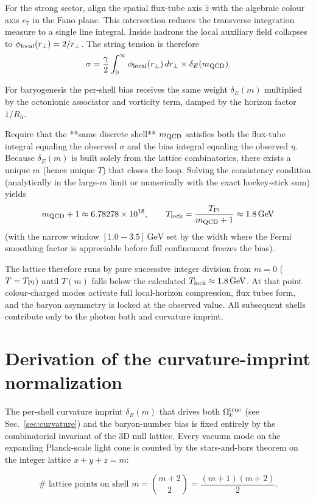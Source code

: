 \documentclass[12pt,a4paper]{article}
\begin{document}
For the strong sector, align the spatial flux-tube axis \(\hat{z}\) with the algebraic colour axis \(e_7\) in the Fano plane. This intersection reduces the transverse integration measure to a single line integral. Inside hadrons the local auxiliary field collapses to \(\phi_{\rm local}(r_\perp) = 2/r_\perp\). The string tension is therefore
\[
\sigma = \frac{\gamma}{2} \int_0^\infty \phi_{\rm local}(r_\perp)\,dr_\perp \times \delta_E(m_{\rm QCD}).
\]

For baryogenesis the per-shell bias receives the same weight \(\delta_E(m)\) multiplied by the octonionic associator and vorticity term, damped by the horizon factor \(1/R_h\).

Require that the **same discrete shell** \(m_{\rm QCD}\) satisfies both the flux-tube integral equaling the observed \(\sigma\) and the bias integral equaling the observed \(\eta\). Because \(\delta_E(m)\) is built solely from the lattice combinatorics, there exists a unique \(m\) (hence unique \(T\)) that closes the loop. Solving the consistency condition (analytically in the large-\(m\) limit or numerically with the exact hockey-stick sum) yields
\[
m_{\rm QCD} + 1 \approx 6.78278 \times 10^{18}, \qquad T_{\rm lock} = \frac{T_{\rm Pl}}{m_{\rm QCD}+1} \approx 1.8\,\text{GeV}
\]
(with the narrow window \([1.0 - 3.5]\,\text{GeV}\) set by the width where the Fermi smoothing factor is appreciable before full confinement freezes the bias).

The lattice therefore runs by pure successive integer division from \(m=0\) (\(T=T_{\rm Pl}\)) until \(T(m)\) falls below the calculated \(T_{\rm lock} \approx 1.8\,\text{GeV}\). At that point colour-charged modes activate full local-horizon compression, flux tubes form, and the baryon asymmetry is locked at the observed value. All subsequent shells contribute only to the photon bath and curvature imprint.

\section{Derivation of the curvature-imprint normalization}
\label{app:curvature-norm}
The per-shell curvature imprint \(\delta_E(m)\) that drives both \(\Omega_k^{\rm true}\) (see Sec.~\ref{sec:curvature}) and the baryon-number bias is fixed entirely by the combinatorial invariant of the 3D null lattice. Every vacuum mode on the expanding Planck-scale light cone is counted by the stars-and-bars theorem on the integer lattice \(x+y+z=m\):

\[
\#\text{ lattice points on shell }m = \binom{m+2}{2} = \frac{(m+1)(m+2)}{2}.
\]
\end{document}
